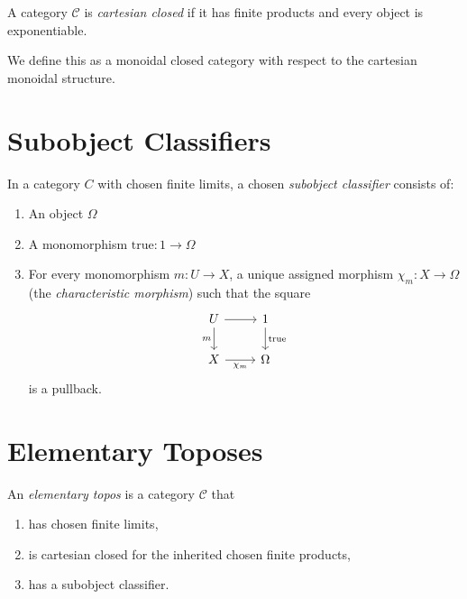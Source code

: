 \begin{definition}
  \label{def:monoidal-closed}
  \mathlibok
  
\end{definition}

\begin{definition} 
  \label{def:cartesian-closed}
  \mathlibok
  A category \(\mathcal{C}\) is \emph{cartesian closed} if it has finite products and every object is exponentiable.

  We define this as a monoidal closed category with respect to the cartesian monoidal structure.
\end{definition}

\section{Subobject Classifiers}

\begin{definition}
  \label{def:subobject-classifier}
  \notready

  In a category $C$ with chosen finite limits, a chosen \emph{subobject classifier} consists of:
  \begin{enumerate}
  \item An object $\Omega$
  \item A monomorphism $\text{true} : 1 \to \Omega$ 
  \item For every monomorphism $m : U \to X$, a unique assigned morphism $\chi_m : X \to \Omega$ (the \emph{characteristic morphism}) such that the square
    \[\begin{tikzcd}
        U \ar[r] \ar[d, "m"'] & 1 \ar[d, "\text{true}"] \\
        X \ar[r, "\chi_m"'] & \Omega
      \end{tikzcd}\]
    is a pullback.
  \end{enumerate}
\end{definition}

\section{Elementary Toposes}

\begin{definition}
\label{def:elementary_topos}
\notready
An \emph{elementary topos} is a category $\mathcal{C}$ that
\begin{enumerate}
\item has chosen finite limits,
\item is cartesian closed for the inherited chosen finite products,
\item has a subobject classifier.
\end{enumerate}
\end{definition}

